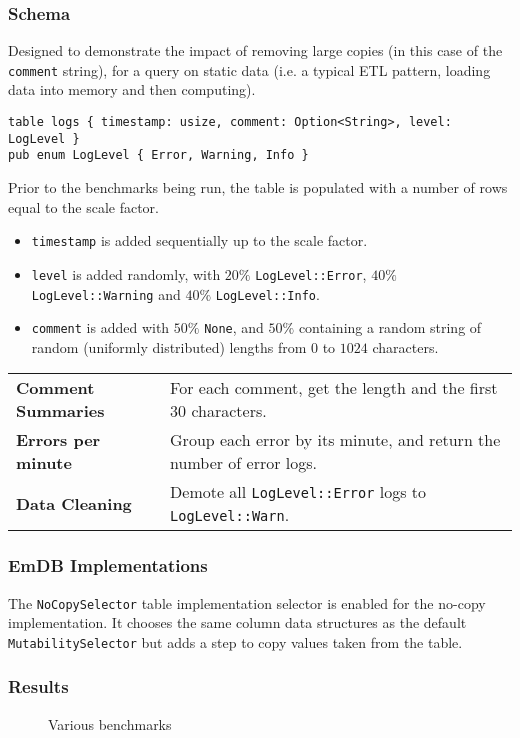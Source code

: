 \subsubsection{Schema}
Designed to demonstrate the impact of removing large copies (in this case of the \texttt{comment} string), for a query on static data (i.e. a typical ETL pattern, loading data into memory and then computing).
\begin{verbatim}
table logs { timestamp: usize, comment: Option<String>, level: LogLevel }
pub enum LogLevel { Error, Warning, Info }
\end{verbatim}
Prior to the benchmarks being run, the table is populated with a number of rows equal to the scale factor.
\begin{itemize}
    \setlength\itemsep{0em}
    \item \texttt{timestamp} is added sequentially up to the scale factor.
    \item \texttt{level} is added randomly, with $20\%$ \texttt{LogLevel::Error}, $40\%$ \texttt{LogLevel::Warning} and $40\%$ \texttt{LogLevel::Info}.
    \item \texttt{comment} is added with $50\%$ \texttt{None}, and $50\%$ containing a random string of random (uniformly distributed) lengths from $0$ to $1024$ characters.
\end{itemize}
\noindent
\begin{tabular}{l p{}}
    \textbf{Comment Summaries} & For each comment, get the length and the first 30 characters. \\
    \textbf{Errors per minute} & Group each error by its minute, and return the number of error logs. \\
    \textbf{Data Cleaning} & Demote all \texttt{LogLevel::Error} logs to \texttt{LogLevel::Warn}. \\ 
\end{tabular}

\subsubsection{EmDB Implementations}
The \texttt{NoCopySelector} table implementation selector is enabled for the no-copy \emdb
implementation. It chooses the same column data structures as the default \texttt{MutabilitySelector}
but adds a step to copy values taken from the table.

\subsubsection{Results}
\begin{figure}[h!]
    \centering
    \vspace{-0.4em}
    \resizebox{\textwidth}{!}{}
    \caption{Various benchmarks}
    \label{fig:data_log_benchmark_results}
\end{figure}

